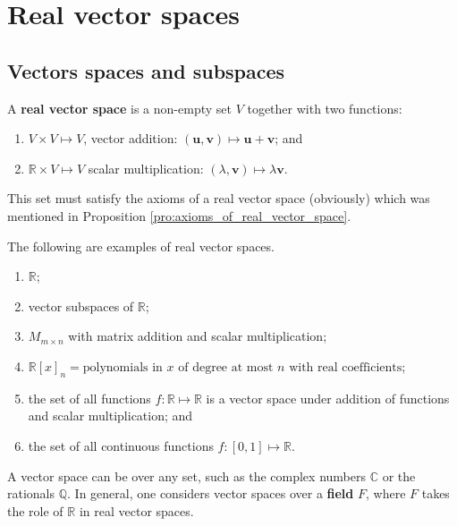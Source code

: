 \chapter{Real vector spaces}

\section{Vectors spaces and subspaces}

\begin{definition}
    A \textbf{real vector space} is a non-empty set $V$ together with two functions:
    \begin{enumerate}
        \item $V \times V \mapsto V$, vector addition: $(\bm{u}, \bm{v}) \mapsto \bm{u} + \bm{v}$; and
        \item $\mathbb{R} \times V \mapsto V$ scalar multiplication: $(\lambda, \bm{v}) \mapsto \lambda \bm{v}$.
    \end{enumerate}
    This set must satisfy the axioms of a real vector space (obviously) which was mentioned in Proposition \ref{pro:axioms_of_real_vector_space}.
\end{definition}

\begin{example}
    The following are examples of real vector spaces.
    \begin{enumerate}
        \item $\mathbb{R}$;
        \item vector subspaces of $\mathbb{R}$;
        \item $M_{m \times n}$ with matrix addition and scalar multiplication;
        \item $\mathbb{R}[x]_n = \text{polynomials in $x$ of degree at most $n$ with real coefficients}$;
        \item the set of all functions $f : \mathbb{R} \mapsto \mathbb{R}$ is a vector space under addition of functions and scalar multiplication; and
        \item the set of all continuous functions $f : [0,1] \mapsto \mathbb{R}$.
    \end{enumerate}
\end{example}

\begin{remark}
    A vector space can be over any set, such as the complex numbers $\mathbb{C}$ or the rationals $\mathbb{Q}$. In general, one considers vector spaces over a \textbf{field} $F$, where $F$ takes the role of $\mathbb{R}$ in real vector spaces. 
\end{remark}

